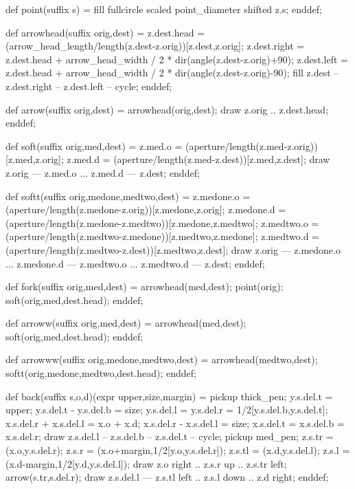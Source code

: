 
def point(suffix s) =
 fill fullcircle scaled point_diameter shifted z.s;
enddef;


def arrowhead(suffix orig,dest) =
 z.dest.head  = (arrow_head_length/length(z.dest-z.orig))[z.dest,z.orig];
 z.dest.right = z.dest.head + arrow_head_width / 2 *
                dir(angle(z.dest-z.orig)+90);
 z.dest.left  = z.dest.head + arrow_head_width / 2 *
                dir(angle(z.dest-z.orig)-90);
 fill z.dest -- z.dest.right -- z.dest.left -- cycle;
enddef;

def arrow(suffix orig,dest) =
 arrowhead(orig,dest); draw z.orig .. z.dest.head;
enddef;


def soft(suffix orig,med,dest) =
 z.med.o = (aperture/length(z.med-z.orig))[z.med,z.orig];
 z.med.d = (aperture/length(z.med-z.dest))[z.med,z.dest];
 draw z.orig --- z.med.o ... z.med.d --- z.dest;
enddef;

def softt(suffix orig,medone,medtwo,dest) =
 z.medone.o = (aperture/length(z.medone-z.orig))[z.medone,z.orig];
 z.medone.d = (aperture/length(z.medone-z.medtwo))[z.medone,z.medtwo];
 z.medtwo.o = (aperture/length(z.medtwo-z.medone))[z.medtwo,z.medone];
 z.medtwo.d = (aperture/length(z.medtwo-z.dest))[z.medtwo,z.dest];
 draw z.orig --- z.medone.o ... z.medone.d
  --- z.medtwo.o ... z.medtwo.d --- z.dest;
enddef;

def fork(suffix orig,med,dest) =
 arrowhead(med,dest); point(orig); soft(orig,med,dest.head);
enddef;

def arroww(suffix orig,med,dest) =
 arrowhead(med,dest); soft(orig,med,dest.head);
enddef;

def arrowww(suffix orig,medone,medtwo,dest) =
 arrowhead(medtwo,dest); softt(orig,medone,medtwo,dest.head);
enddef;

def back(suffix s,o,d)(expr upper,size,margin) =
 pickup thick_pen;
 y.s.del.t = upper; y.s.del.t - y.s.del.b = size;
 y.s.del.l = y.s.del.r = 1/2[y.s.del.b,y.s.del.t];
 x.s.del.r + x.s.del.l = x.o + x.d;
 x.s.del.r - x.s.del.l = size;
 x.s.del.t = x.s.del.b = x.s.del.r;
 draw z.s.del.l -- z.s.del.b -- z.s.del.t -- cycle;
 pickup med_pen;
 z.s.tr = (x.o,y.s.del.r);
 z.s.r =  (x.o+margin,1/2[y.o,y.s.del.r]);
 z.s.tl = (x.d,y.s.del.l);
 z.s.l =  (x.d-margin,1/2[y.d,y.s.del.l]);
 draw z.o {right} .. z.s.r {up} .. z.s.tr {left};
 arrow(s.tr,s.del.r);
 draw z.s.del.l --- z.s.tl {left} .. z.s.l {down} .. z.d {right};
enddef;

